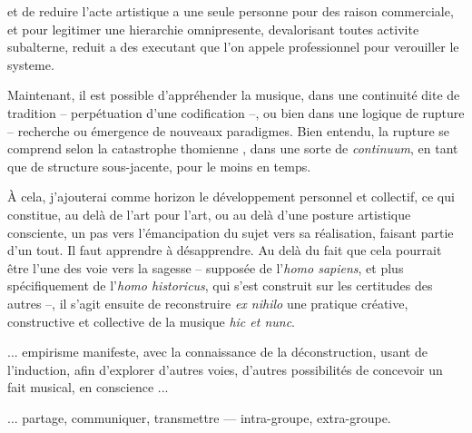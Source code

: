 \documentclass{article}
\newcommand{\footref}[1]{%
  \enotezwritemark{\enmarkstyle\ref{#1}}%
}
\begin{document}
et de reduire l'acte artistique a une seule personne pour des raison commerciale, et pour legitimer une hierarchie omnipresente, devalorisant toutes activite subalterne, reduit a des executant que l'on appele professionnel pour verouiller le systeme.


\bigskip

Maintenant, il est possible d'appréhender la musique, dans une continuité dite de tradition -- perpétuation d'une codification --, ou bien dans une logique de rupture -- recherche ou émergence de nouveaux paradigmes. Bien entendu, la rupture se comprend selon la catastrophe thomienne\footref{efn:thom}%
, dans une sorte de \textit{continuum}, en tant que de structure sous-jacente, pour le moins en temps. 

\bigskip

À cela, j'ajouterai comme horizon le développement personnel et collectif, ce qui constitue, au delà de l'art pour l'art, ou au delà d'une posture artistique consciente, un pas vers l'émancipation du sujet vers sa réalisation, faisant partie d'un tout. Il faut apprendre à désapprendre. 
Au delà du fait que cela pourrait être l'une des voie vers la sagesse -- supposée de l'\textit{homo sapiens}, et plus spécifiquement de l'\textit{homo historicus}, qui s'est construit sur les certitudes des autres --, il s'agit ensuite de reconstruire \textit{ex nihilo} une pratique créative, constructive et collective de la musique \textit{hic et nunc}. 

... empirisme manifeste, avec la connaissance de la déconstruction, usant de l'induction, afin d'explorer d'autres voies, d'autres possibilités de concevoir un fait musical, en conscience ...

... partage, communiquer, transmettre --- intra-groupe, extra-groupe.
\end{document}

